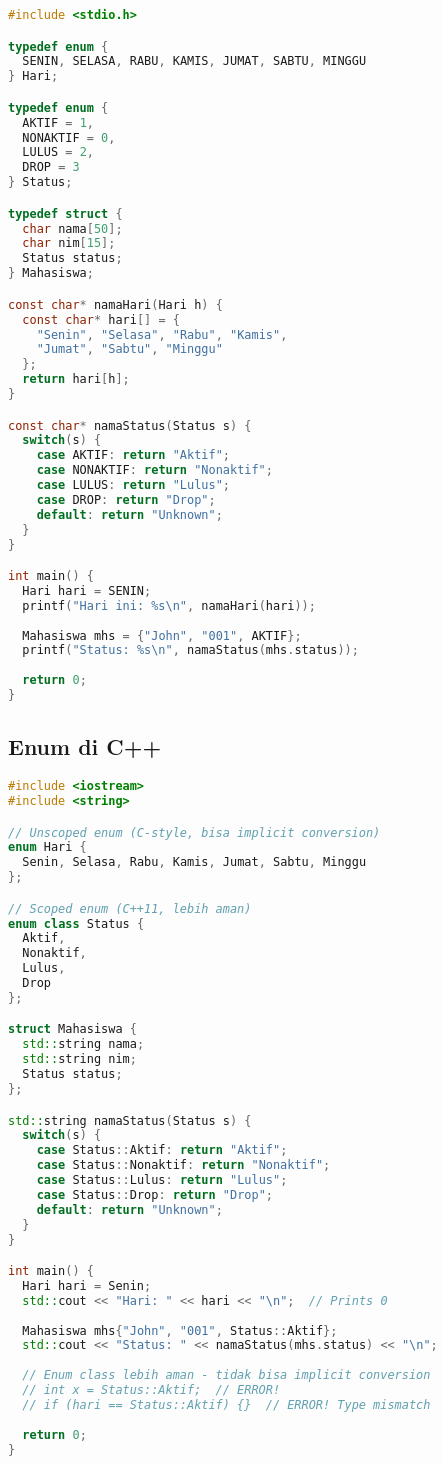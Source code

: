 \documentclass[../main.tex]{subfiles}
\begin{document}
\begin{lstlisting}[language=C, caption={Enum di C}]
#include <stdio.h>

typedef enum {
  SENIN, SELASA, RABU, KAMIS, JUMAT, SABTU, MINGGU
} Hari;

typedef enum {
  AKTIF = 1,
  NONAKTIF = 0,
  LULUS = 2,
  DROP = 3
} Status;

typedef struct {
  char nama[50];
  char nim[15];
  Status status;
} Mahasiswa;

const char* namaHari(Hari h) {
  const char* hari[] = {
    "Senin", "Selasa", "Rabu", "Kamis",
    "Jumat", "Sabtu", "Minggu"
  };
  return hari[h];
}

const char* namaStatus(Status s) {
  switch(s) {
    case AKTIF: return "Aktif";
    case NONAKTIF: return "Nonaktif";
    case LULUS: return "Lulus";
    case DROP: return "Drop";
    default: return "Unknown";
  }
}

int main() {
  Hari hari = SENIN;
  printf("Hari ini: %s\n", namaHari(hari));
  
  Mahasiswa mhs = {"John", "001", AKTIF};
  printf("Status: %s\n", namaStatus(mhs.status));
  
  return 0;
}
\end{lstlisting}

\subsection{Enum di C++}

\begin{lstlisting}[language=C++, caption={Enum class di C++}]
#include <iostream>
#include <string>

// Unscoped enum (C-style, bisa implicit conversion)
enum Hari {
  Senin, Selasa, Rabu, Kamis, Jumat, Sabtu, Minggu
};

// Scoped enum (C++11, lebih aman)
enum class Status {
  Aktif,
  Nonaktif,
  Lulus,
  Drop
};

struct Mahasiswa {
  std::string nama;
  std::string nim;
  Status status;
};

std::string namaStatus(Status s) {
  switch(s) {
    case Status::Aktif: return "Aktif";
    case Status::Nonaktif: return "Nonaktif";
    case Status::Lulus: return "Lulus";
    case Status::Drop: return "Drop";
    default: return "Unknown";
  }
}

int main() {
  Hari hari = Senin;
  std::cout << "Hari: " << hari << "\n";  // Prints 0
  
  Mahasiswa mhs{"John", "001", Status::Aktif};
  std::cout << "Status: " << namaStatus(mhs.status) << "\n";
  
  // Enum class lebih aman - tidak bisa implicit conversion
  // int x = Status::Aktif;  // ERROR!
  // if (hari == Status::Aktif) {}  // ERROR! Type mismatch
  
  return 0;
}
\end{lstlisting}
\end{document}
